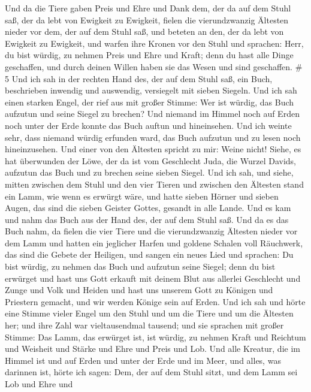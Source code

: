 Und da die Tiere gaben Preis und Ehre und Dank dem, der da auf dem Stuhl
saß, der da lebt von Ewigkeit zu Ewigkeit,  fielen die
vierundzwanzig Ältesten nieder vor dem, der auf dem Stuhl saß, und
beteten an den, der da lebt von Ewigkeit zu Ewigkeit, und warfen ihre
Kronen vor den Stuhl und sprachen:  Herr, du bist würdig,
zu nehmen Preis und Ehre und Kraft; denn du hast alle Dinge geschaffen,
und durch deinen Willen haben sie das Wesen und sind geschaffen. \# 5
 Und ich sah in der rechten Hand des, der auf dem Stuhl saß,
ein Buch, beschrieben inwendig und auswendig, versiegelt mit sieben
Siegeln.  Und ich sah einen starken Engel, der rief aus mit
großer Stimme: Wer ist würdig, das Buch aufzutun und seine Siegel zu
brechen?  Und niemand im Himmel noch auf Erden noch unter
der Erde konnte das Buch auftun und hineinsehen.  Und ich
weinte sehr, dass niemand würdig erfunden ward, das Buch aufzutun und zu
lesen noch hineinzusehen.  Und einer von den Ältesten
spricht zu mir: Weine nicht! Siehe, es hat überwunden der Löwe, der da
ist vom Geschlecht Juda, die Wurzel Davids, aufzutun das Buch und zu
brechen seine sieben Siegel.  Und ich sah, und siehe, mitten
zwischen dem Stuhl und den vier Tieren und zwischen den Ältesten stand
ein Lamm, wie wenn es erwürgt wäre, und hatte sieben Hörner und sieben
Augen, das sind die sieben Geister Gottes, gesandt in alle Lande.
 Und es kam und nahm das Buch aus der Hand des, der auf dem
Stuhl saß.  Und da es das Buch nahm, da fielen die vier
Tiere und die vierundzwanzig Ältesten nieder vor dem Lamm und hatten ein
jeglicher Harfen und goldene Schalen voll Räuchwerk, das sind die Gebete
der Heiligen,  und sangen ein neues Lied und sprachen: Du
bist würdig, zu nehmen das Buch und aufzutun seine Siegel; denn du bist
erwürget und hast uns Gott erkauft mit deinem Blut aus allerlei
Geschlecht und Zunge und Volk und Heiden  und hast uns
unserem Gott zu Königen und Priestern gemacht, und wir werden Könige
sein auf Erden.  Und ich sah und hörte eine Stimme vieler
Engel um den Stuhl und um die Tiere und um die Ältesten her; und ihre
Zahl war vieltausendmal tausend;  und sie sprachen mit
großer Stimme: Das Lamm, das erwürget ist, ist würdig, zu nehmen Kraft
und Reichtum und Weisheit und Stärke und Ehre und Preis und Lob.
 Und alle Kreatur, die im Himmel ist und auf Erden und
unter der Erde und im Meer, und alles, was darinnen ist, hörte ich
sagen: Dem, der auf dem Stuhl sitzt, und dem Lamm sei Lob und Ehre und
